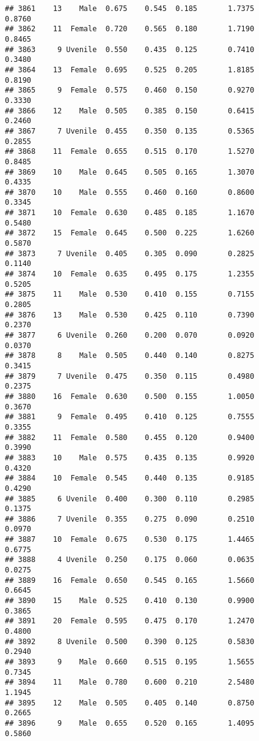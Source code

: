 \documentclass[
]{article}
\begin{document}
\begin{verbatim}
## 3861    13    Male  0.675    0.545  0.185       1.7375         0.8760
## 3862    11  Female  0.720    0.565  0.180       1.7190         0.8465
## 3863     9 Uvenile  0.550    0.435  0.125       0.7410         0.3480
## 3864    13  Female  0.695    0.525  0.205       1.8185         0.8190
## 3865     9  Female  0.575    0.460  0.150       0.9270         0.3330
## 3866    12    Male  0.505    0.385  0.150       0.6415         0.2460
## 3867     7 Uvenile  0.455    0.350  0.135       0.5365         0.2855
## 3868    11  Female  0.655    0.515  0.170       1.5270         0.8485
## 3869    10    Male  0.645    0.505  0.165       1.3070         0.4335
## 3870    10    Male  0.555    0.460  0.160       0.8600         0.3345
## 3871    10  Female  0.630    0.485  0.185       1.1670         0.5480
## 3872    15  Female  0.645    0.500  0.225       1.6260         0.5870
## 3873     7 Uvenile  0.405    0.305  0.090       0.2825         0.1140
## 3874    10  Female  0.635    0.495  0.175       1.2355         0.5205
## 3875    11    Male  0.530    0.410  0.155       0.7155         0.2805
## 3876    13    Male  0.530    0.425  0.110       0.7390         0.2370
## 3877     6 Uvenile  0.260    0.200  0.070       0.0920         0.0370
## 3878     8    Male  0.505    0.440  0.140       0.8275         0.3415
## 3879     7 Uvenile  0.475    0.350  0.115       0.4980         0.2375
## 3880    16  Female  0.630    0.500  0.155       1.0050         0.3670
## 3881     9  Female  0.495    0.410  0.125       0.7555         0.3355
## 3882    11  Female  0.580    0.455  0.120       0.9400         0.3990
## 3883    10    Male  0.575    0.435  0.135       0.9920         0.4320
## 3884    10  Female  0.545    0.440  0.135       0.9185         0.4290
## 3885     6 Uvenile  0.400    0.300  0.110       0.2985         0.1375
## 3886     7 Uvenile  0.355    0.275  0.090       0.2510         0.0970
## 3887    10  Female  0.675    0.530  0.175       1.4465         0.6775
## 3888     4 Uvenile  0.250    0.175  0.060       0.0635         0.0275
## 3889    16  Female  0.650    0.545  0.165       1.5660         0.6645
## 3890    15    Male  0.525    0.410  0.130       0.9900         0.3865
## 3891    20  Female  0.595    0.475  0.170       1.2470         0.4800
## 3892     8 Uvenile  0.500    0.390  0.125       0.5830         0.2940
## 3893     9    Male  0.660    0.515  0.195       1.5655         0.7345
## 3894    11    Male  0.780    0.600  0.210       2.5480         1.1945
## 3895    12    Male  0.505    0.405  0.140       0.8750         0.2665
## 3896     9    Male  0.655    0.520  0.165       1.4095         0.5860

\end{verbatim}
\end{document}
